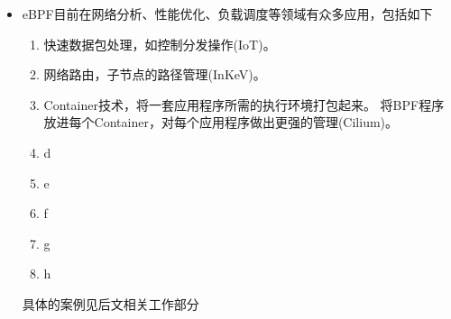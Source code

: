 \documentclass[AutoFakeBold,a4paper]{ctexart}
\begin{document}
\begin{itemize}
    \item eBPF目前在网络分析、性能优化、负载调度等领域有众多应用，包括如下
    \begin{enumerate}
        \item 快速数据包处理，如控制分发操作(IoT)。
        \item 网络路由，子节点的路径管理(InKeV)。
        \item Container技术，将一套应用程序所需的执行环境打包起来。
        将BPF程序放进每个Container，对每个应用程序做出更强的管理(Cilium)。
        \item d
        \item e
        \item f
        \item g
        \item h
    \end{enumerate}
    具体的案例见后文相关工作部分

    



\end{itemize}
\end{document}
